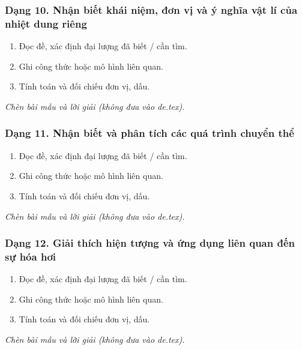 \subsubsection{Dạng 10. Nhận biết khái niệm, đơn vị và ý nghĩa vật lí của nhiệt dung riêng}
\begin{phuongphap}
\begin{enumerate}
\item Đọc đề, xác định đại lượng đã biết / cần tìm.
\item Ghi công thức hoặc mô hình liên quan.
\item Tính toán và đối chiếu đơn vị, dấu.
\end{enumerate}
\end{phuongphap}
\begin{vidumau}
\textit{Chèn bài mẫu và lời giải (không đưa vào de.tex).}
\end{vidumau}

\subsubsection{Dạng 11. Nhận biết và phân tích các quá trình chuyển thể}
\begin{phuongphap}
\begin{enumerate}
\item Đọc đề, xác định đại lượng đã biết / cần tìm.
\item Ghi công thức hoặc mô hình liên quan.
\item Tính toán và đối chiếu đơn vị, dấu.
\end{enumerate}
\end{phuongphap}
\begin{vidumau}
\textit{Chèn bài mẫu và lời giải (không đưa vào de.tex).}
\end{vidumau}

\subsubsection{Dạng 12. Giải thích hiện tượng và ứng dụng liên quan đến sự hóa hơi}
\begin{phuongphap}
\begin{enumerate}
\item Đọc đề, xác định đại lượng đã biết / cần tìm.
\item Ghi công thức hoặc mô hình liên quan.
\item Tính toán và đối chiếu đơn vị, dấu.
\end{enumerate}
\end{phuongphap}
\begin{vidumau}
\textit{Chèn bài mẫu và lời giải (không đưa vào de.tex).}
\end{vidumau}

